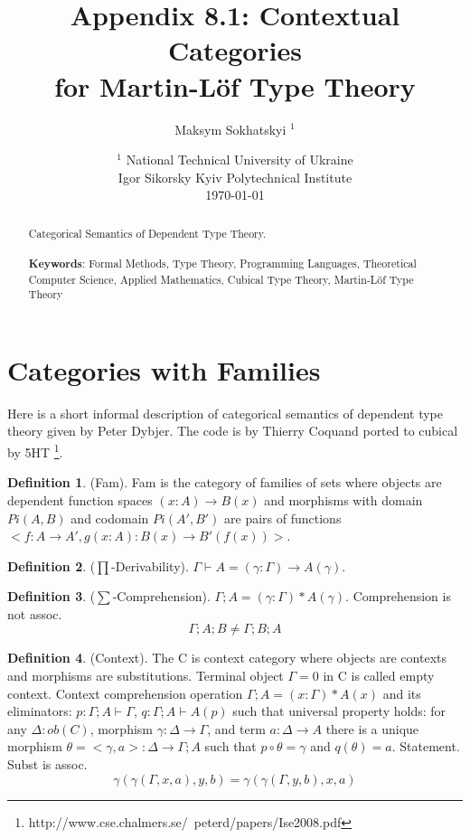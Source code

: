 \documentclass{article}
\theoremstyle{definition}
\newtheorem{definition}{Definition}
\begin{document}
\title{Appendix 8.1: Contextual Categories \\for Martin-Löf Type Theory}
\author{Maksym Sokhatskyi $^1$}
\date{
    $^1$ National Technical University of Ukraine \\
    \small Igor Sikorsky Kyiv Polytechnical Institute\\
    \today
}

\maketitle

\begin{abstract}

Categorical Semantics of Dependent Type Theory.
\\
\\
{\bf Keywords}: Formal Methods, Type Theory, Programming Languages,
          Theoretical Computer Science, Applied Mathematics,
          Cubical Type Theory, Martin-Löf Type Theory
\end{abstract}
\tableofcontents

\newpage
\section*{Categories with Families}

Here is a short informal description of
categorical semantics of dependent type theory given by Peter Dybjer.
The code is by Thierry Coquand ported to cubical by 5HT
\footnote{http://www.cse.chalmers.se/~peterd/papers/Ise2008.pdf}.

\begin{definition} (Fam). Fam is the category of families
of sets where objects are dependent function
spaces $(x:A)\rightarrow B(x)$ and morphisms with domain
$Pi(A,B)$ and codomain $Pi(A',B')$ are pairs of
functions $<f:A\rightarrow A',g(x:A):B(x)\rightarrow B'(f(x))>$.
\end{definition}

\begin{definition} ($\prod$-Derivability).
$\Gamma\vdash A = (\gamma:\Gamma)\rightarrow A(\gamma)$.
\end{definition}

\begin{definition} ($\sum$-Comprehension).
$\Gamma;A = (\gamma:\Gamma)*A(\gamma)$. Comprehension is not assoc.
$$
    \Gamma;A;B \neq \Gamma;B;A
$$
\end{definition}

\begin{definition} (Context).
The C is context category where objects are contexts and morphisms are substitutions.
Terminal object $\Gamma=0$ in C is called empty context.
Context comprehension operation $\Gamma;A = (x:\Gamma)*A(x)$ and
its eliminators: $p:\Gamma;A\vdash\Gamma$, $q:\Gamma;A\vdash A(p)$ such that
universal property holds: for any $\Delta:ob(C)$, morphism $\gamma:\Delta\rightarrow\Gamma$,
and term $a:\Delta\rightarrow A$ there is a unique morphism $\theta=<\gamma,a>:\Delta\rightarrow\Gamma;A$
such that $p\circ\theta=\gamma$ and $q(\theta)=a$. Statement. Subst is assoc.
$$
    \gamma(\gamma(\Gamma,x,a),y,b) = \gamma(\gamma(\Gamma,y,b),x,a)
$$
\end{definition}
\end{document}
